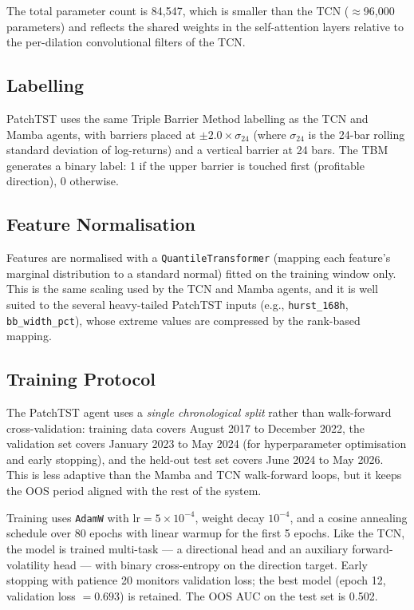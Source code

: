 The total parameter count is 84,547, which is smaller than the TCN ($\approx$96,000 parameters) and reflects the shared weights in the self-attention layers relative to the per-dilation convolutional filters of the TCN.

\subsection{Labelling}

PatchTST uses the same Triple Barrier Method labelling as the TCN and Mamba agents, with barriers placed at $\pm 2.0 \times \sigma_{24}$ (where $\sigma_{24}$ is the 24-bar rolling standard deviation of log-returns) and a vertical barrier at 24 bars. The TBM generates a binary label: 1 if the upper barrier is touched first (profitable direction), 0 otherwise.

\subsection{Feature Normalisation}

Features are normalised with a \texttt{QuantileTransformer} (mapping each feature's marginal distribution to a standard normal) fitted on the training window only. This is the same scaling used by the TCN and Mamba agents, and it is well suited to the several heavy-tailed PatchTST inputs (e.g., \texttt{hurst\_168h}, \texttt{bb\_width\_pct}), whose extreme values are compressed by the rank-based mapping.

\subsection{Training Protocol}

The PatchTST agent uses a \textit{single chronological split} rather than walk-forward cross-validation: training data covers August 2017 to December 2022, the validation set covers January 2023 to May 2024 (for hyperparameter optimisation and early stopping), and the held-out test set covers June 2024 to May 2026. This is less adaptive than the Mamba and TCN walk-forward loops, but it keeps the OOS period aligned with the rest of the system.


Training uses \texttt{AdamW} with $\text{lr} = 5 \times 10^{-4}$, weight decay $10^{-4}$, and a cosine annealing schedule over 80 epochs with linear warmup for the first 5 epochs. Like the TCN, the model is trained multi-task --- a directional head and an auxiliary forward-volatility head --- with binary cross-entropy on the direction target. Early stopping with patience 20 monitors validation loss; the best model (epoch 12, validation loss $= 0.693$) is retained. The OOS AUC on the test set is 0.502.


